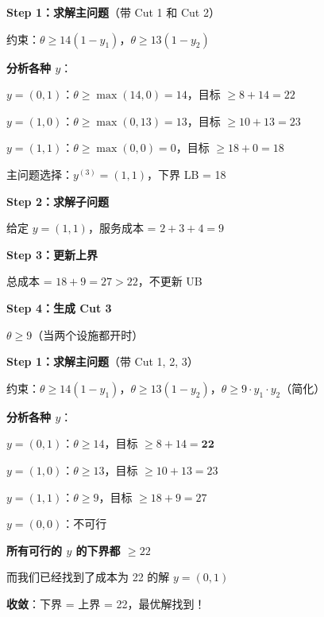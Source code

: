 \documentclass[12pt, a4paper]{ctexart}
\begin{document}
\begin{blackboard}[Benders 迭代：第3轮]

\textbf{Step 1：求解主问题}（带 Cut 1 和 Cut 2）

约束：$\theta \geq 14(1 - y_1)$，$\theta \geq 13(1 - y_2)$

\textbf{分析各种 $y$}：

$y = (0, 1)$：$\theta \geq \max(14, 0) = 14$，目标 $\geq 8 + 14 = 22$

$y = (1, 0)$：$\theta \geq \max(0, 13) = 13$，目标 $\geq 10 + 13 = 23$

$y = (1, 1)$：$\theta \geq \max(0, 0) = 0$，目标 $\geq 18 + 0 = 18$

主问题选择：$y^{(3)} = (1, 1)$，下界 LB = 18

\textbf{Step 2：求解子问题}

给定 $y = (1, 1)$，服务成本 = $2 + 3 + 4 = 9$

\textbf{Step 3：更新上界}

总成本 = $18 + 9 = 27 > 22$，不更新 UB

\textbf{Step 4：生成 Cut 3}

$\theta \geq 9$（当两个设施都开时）

\end{blackboard}

\begin{blackboard}[Benders 迭代：第4轮（收敛）]

\textbf{Step 1：求解主问题}（带 Cut 1, 2, 3）

约束：$\theta \geq 14(1-y_1)$，$\theta \geq 13(1-y_2)$，$\theta \geq 9 \cdot y_1 \cdot y_2$（简化）

\textbf{分析各种 $y$}：

$y = (0, 1)$：$\theta \geq 14$，目标 $\geq 8 + 14 = \mathbf{22}$

$y = (1, 0)$：$\theta \geq 13$，目标 $\geq 10 + 13 = 23$

$y = (1, 1)$：$\theta \geq 9$，目标 $\geq 18 + 9 = 27$

$y = (0, 0)$：不可行

\textbf{所有可行的 $y$ 的下界都 $\geq 22$}

而我们已经找到了成本为 22 的解 $y = (0, 1)$

\textbf{收敛}：下界 = 上界 = 22，最优解找到！

\end{blackboard}
\end{document}
